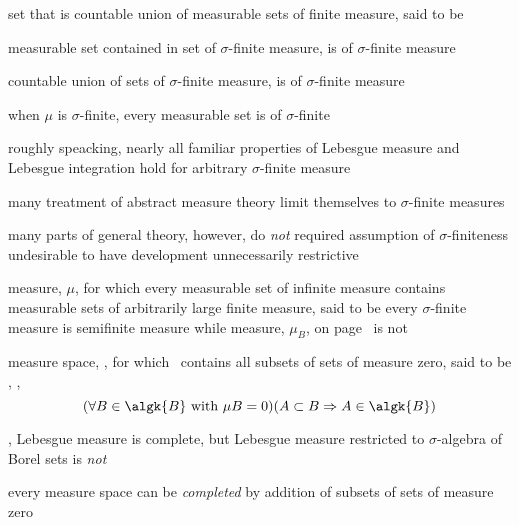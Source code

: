 \documentclass[17pt,landscape]{foils}
\newcommand{\algB}{\algk{B}}
\begin{document}
{{	\vitem set that is countable union of measurable sets of finite measure,
		said to be 

	\vvitem measurable set contained in set of $\sigma$-finite measure,
		is of $\sigma$-finite measure

	\vitem countable union of sets of $\sigma$-finite measure,
		is of $\sigma$-finite measure

	\vvitem when $\mu$ is $\sigma$-finite,
		every measurable set is of $\sigma$-finite
\eit
\vfill



\bit
	\item roughly speacking, nearly all familiar properties of Lebesgue measure and Lebesgue integration
		hold for arbitrary $\sigma$-finite measure

	\vitem many treatment of abstract measure theory limit themselves to $\sigma$-finite measures

	\vfill
	\vfill
	\vvitem many parts of general theory, however, do \emph{not} required
		assumption of $\sigma$-finiteness
	\vitem undesirable to have development unnecessarily restrictive

	\vfill
	\vfill
	\vvitem measure, $\mu$, for which every measurable set of infinite measure
		contains measurable sets of arbitrarily large finite measure,
		said to be %
	\vitem every $\sigma$-finite measure is semifinite measure
		while measure, $\mu_B$, on page~\pageref{page:interesting-(and-bizarre)-example}
		is not
\eit
\vfill



\bit
	\item measure space, \meas{X}{\algB}{\mu}, for which \algB\ contains all subsets of sets of measure zero,
		said to be ,%
		\ie,
		\[
			(\forall B\in\algB \mbox{ with } \mu B=0)
			(A \subset B \Rightarrow A \in \algB)
		\]
	\bit
		\item \eg, Lebesgue measure is complete, but Lebesgue measure restricted to $\sigma$-algebra of Borel sets
			is \emph{not}
	\eit

	\vitem every measure space can be \emph{completed} by addition of subsets of sets of measure zero%

}}
\end{document}
